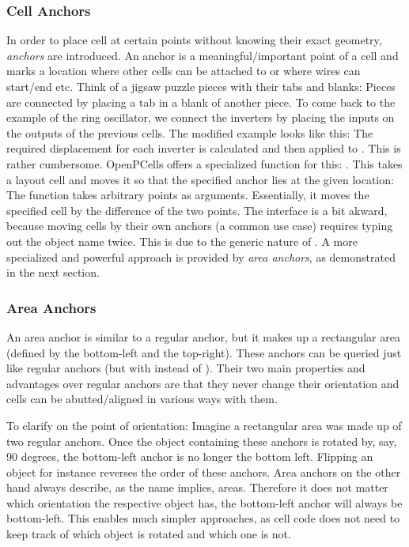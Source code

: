 \subsubsection{Cell Anchors}
In order to place cell at certain points without knowing their exact geometry, \emph{anchors} are introduced.
An anchor is a meaningful/important point of a cell and marks a location where other cells can be attached to or where wires can start/end etc.
Think of a jigsaw puzzle pieces with their tabs and blanks: Pieces are connected by placing a tab in a blank of another piece.
To come back to the example of the ring oscillator, we connect the inverters by placing the inputs on the outputs of the previous cells.
The modified example looks like this:
The required displacement for each inverter is calculated and then applied to .
This is rather cumbersome.
OpenPCells offers a specialized function for this: .
This takes a layout cell and moves it so that the specified anchor lies at the given location:
The function  takes arbitrary points as arguments.
Essentially, it moves the specified cell by the difference of the two points.
The interface is a bit akward, because moving cells by their own anchors (a common use case) requires typing out the object name twice.
This is due to the generic nature of .
A more specialized and powerful approach is provided by \emph{area anchors}, as demonstrated in the next section.

\subsubsection{Area Anchors}
An area anchor is similar to a regular anchor, but it makes up a rectangular area (defined by the bottom-left and the top-right).
These anchors can be queried just like regular anchors (but with  instead of ).
Their two main properties and advantages over regular anchors are that they never change their orientation and cells can be abutted/aligned in various ways with them.

To clarify on the point of orientation:
Imagine a rectangular area was made up of two regular anchors.
Once the object containing these anchors is rotated by, say, 90 degrees, the bottom-left anchor is no longer the bottom left.
Flipping an object for instance reverses the order of these anchors.
Area anchors on the other hand always describe, as the name implies, areas.
Therefore it does not matter which orientation the respective object has, the bottom-left anchor will always be bottom-left.
This enables much simpler approaches, as cell code does not need to keep track of which object is rotated and which one is not.

